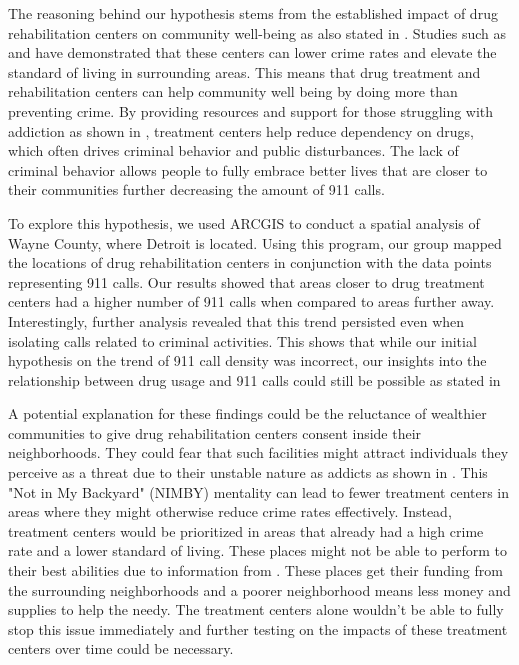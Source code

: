 \documentclass[12pt]{article}
\begin{document}
The reasoning behind our hypothesis stems from the established impact of drug rehabilitation centers on community well-being as also stated in \cite{SAT_centers_and_crime}.  Studies such as \cite{drugs_and_crime} and \cite{drugs_crime_space_time} have demonstrated that these centers can lower crime rates and elevate the standard of living in surrounding areas. This means that drug treatment and rehabilitation centers can help community well being by doing more than preventing crime. By providing resources and support for those struggling with addiction as shown in \cite{mental_healthcare_and_crime}, treatment centers help reduce dependency on drugs, which often drives criminal behavior and public disturbances. The lack of criminal behavior allows people to fully embrace better lives that are closer to their communities further decreasing the amount of 911 calls. 

To explore this hypothesis, we used ARCGIS to conduct a spatial analysis of Wayne County, where Detroit is located. Using this program, our group mapped the locations of drug rehabilitation centers in conjunction with the data points representing 911 calls. Our results showed that areas closer to drug treatment centers had a higher number of 911 calls when compared to areas further away.  Interestingly, further analysis revealed that this trend persisted even when isolating calls related to criminal activities. This shows that while our initial hypothesis on the trend of 911 call density was incorrect, our insights into the relationship between drug usage and 911 calls could still be possible as stated in \cite{Socioeconomic-Determinants} 

A potential explanation for these findings could be the reluctance of wealthier communities to give drug rehabilitation centers consent inside their neighborhoods. They could fear that such facilities might attract individuals they perceive as a threat due to their unstable nature as addicts as shown in \cite{mental_health_and_disability}. This "Not in My Backyard" (NIMBY) mentality can lead to fewer treatment centers in areas where they might otherwise reduce crime rates effectively. Instead, treatment centers would be prioritized in areas that already had a high crime rate and a lower standard of living. These places might not be able to perform to their best abilities due to information from \cite{cost_of_drug_treatment}. These places get their funding from the surrounding neighborhoods and a poorer neighborhood means less money and supplies to help the needy. The treatment centers alone wouldn't be able to fully stop this issue immediately and further testing on the impacts of these treatment centers over time could be necessary. 
\end{document}
